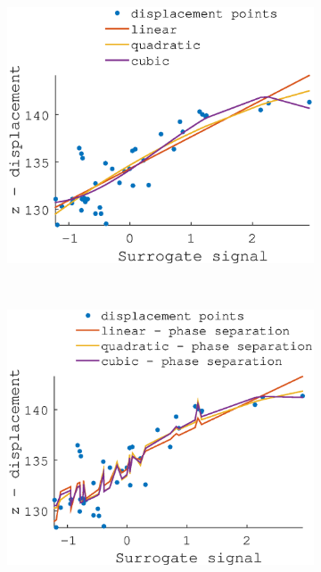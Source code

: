 \documentclass[11pt,a4paper,oneside]{report}
\begin{document}
\begin{figure}
  \hspace*{-2em}
  \begin{subfigure}[b]{0.33\textwidth}
    \includegraphics[width=\textwidth, trim=0 0 0 110,clip=true]{figures/task2/fit_round1_couch2.eps}
  \end{subfigure}%
    ~ %
  \begin{subfigure}[b]{0.33\textwidth}
    \includegraphics[width=\textwidth, trim=0 0 0 110,clip=true]{figures/task2/fit_round2_couch2.eps}

\end{subfigure}
\end{figure}
\end{document}

